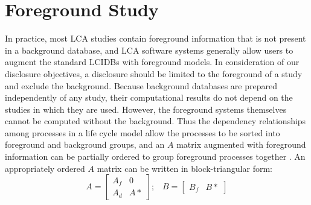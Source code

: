 \section{Foreground Study}

In practice, most LCA studies contain foreground information that is not present in a background database, and LCA software systems generally allow users to augment the standard LCIDBs with foreground models.  In consideration of our disclosure objectives, a disclosure should be limited to the foreground of a study and exclude the background.  Because background databases are prepared independently of any study, their computational results do not depend on the studies in which they are used.  However, the foreground systems themselves cannot be computed without the background.  Thus the dependency relationships among processes in a life cycle model allow the processes to be sorted into foreground and background groups, and an $A$ matrix augmented with foreground information can be partially ordered to group foreground processes together \citep{Kuczenski_JLCA_2015}.  An appropriately ordered $A$ matrix can be written in block-triangular form:
\begin{equation}
A = \left[\begin{array}{cc}
A_f & 0 \\
A_d &  A*
  \end{array}
\right];\;\;\;  B = \left[\begin{array}{cc} B_f & B*   \end{array}\right]
\label{eqn:foreground}
\end{equation}


